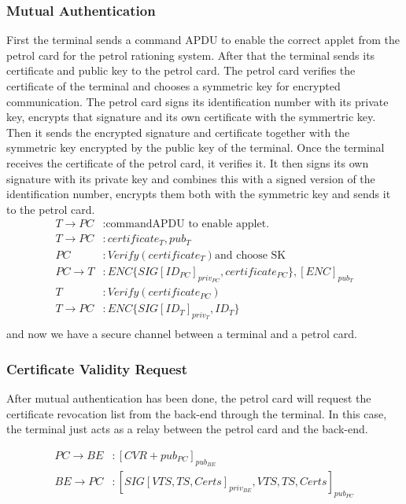 \subsubsection{Mutual Authentication}
First the terminal sends a command APDU to enable the correct applet from the petrol card for the petrol rationing system. After that the terminal sends its certificate and public key to the petrol card. The petrol card verifies the certificate of the terminal and chooses a symmetric key for encrypted communication. The petrol card signs its identification number with its private key, encrypts that signature and its own certificate with the symmertric key. Then it sends the encrypted signature and certificate together with the symmetric key encrypted by the public key of the terminal. Once the terminal receives the certificate of the petrol card, it verifies it. It then signs its own signature with its private key and combines this with a signed version of the identification number, encrypts them both with the symmetric key and sends it to the petrol card.
\\

\begin{equation}\nonumber
\begin{split} 
T \to PC &: \text{commandAPDU to enable applet.}\\
T \to PC &: certificate_{T}, pub_{T}\\ 
PC &: Verify(certificate_{T}) \text{and choose SK}\\
PC \to T &: ENC\{SIG[ID_{PC}]_{priv_{PC}}, certificate_{PC}\},  [ENC]_{pub_T}\\
T&: Verify(certificate_{PC})\\
T \to PC &: ENC\{SIG[ID_{T}]_{priv_T}, ID_{T}\} \\ 
\end{split} 
\end{equation}
and now we have a secure channel between a terminal and a petrol card.

\subsubsection{Certificate Validity Request}
After mutual authentication has been done, the petrol card will request the certificate revocation list from the back-end through the terminal. In this case, the terminal just acts as a relay between the petrol card and the back-end.

\begin{equation}\nonumber
\begin{split}
PC \to BE &: [CVR + pub_{PC}]_{pub_{BE}}\\
BE \to PC &: [SIG[VTS, TS, Certs]_{priv_{BE}}, VTS, TS, Certs]_{pub_{PC}}
\end{split} 
\end{equation}
